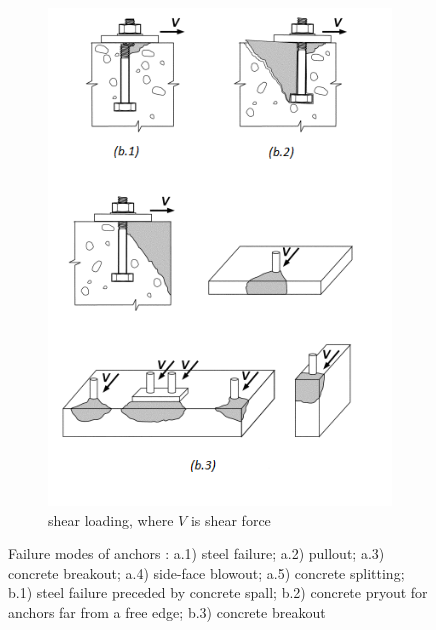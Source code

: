 \begin{figure}
\begin{subfigure}{.5\textwidth}
		\includegraphics[width=.9\linewidth]{obrazky/failure_models_shear.png}
		\caption{shear loading, where $V$ is shear force}
		\label{obr:shear_loaded}
	\end{subfigure}
	\caption[Failure modes of anchors]{Failure modes of anchors \cite{anchors-ACI-318M}: a.1) steel failure; a.2) pullout; a.3) concrete breakout; a.4) side-face blowout; a.5) concrete splitting; b.1) steel failure preceded by concrete spall; b.2) concrete pryout for anchors far from a free edge; b.3) concrete breakout}
	\label{obr:failture_models}
\end{figure}


